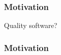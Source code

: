 
  \begin{frame}
    \frametitle{Motivation}
    \begin{center}
    {\HUGE \textcolor{solarizedViolet}{Quality} software?}
    \end{center}
  \end{frame}

\begin{frame}%
  \frametitle{Motivation}
  \begin{center}
  \end{center}
\end{frame}



